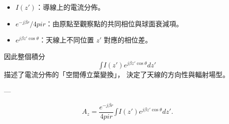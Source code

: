 \documentclass{article}
\def\pi{pi}%
\def\dfrac#1#2{#1/#2}%
\def\int{\text{∫}}%
\begin{document}
\begin{itemize}
  \item $I(z')$：導線上的電流分佈。
  \item $\dfrac{e^{-j\beta r}}{4\pi r}$：由原點至觀察點的共同相位與球面衰減項。
  \item $e^{j\beta z'\cos\theta}$：天線上不同位置 $z'$ 對應的相位差。
\end{itemize}

因此整個積分
\[
\int I(z') e^{j\beta z'\cos\theta} dz'
\]
描述了電流分佈的「空間傅立葉變換」，
決定了天線的方向性與輻射場型。

---

\[
\boxed{
A_z = \frac{e^{-j\beta r}}{4\pi r}
\int I(z') e^{j\beta z'\cos\theta} dz'.
}
\]
\end{document}
